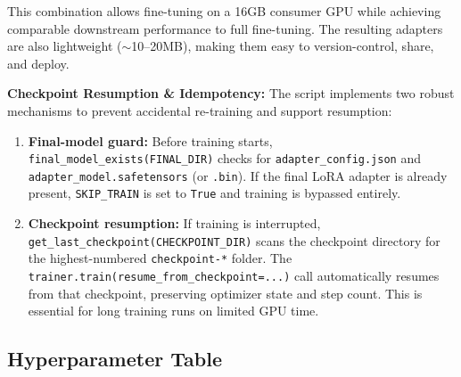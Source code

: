\documentclass[11pt,a4paper]{article}
\begin{document}
This combination allows fine-tuning on a 16GB consumer GPU while achieving comparable downstream performance to full fine-tuning. The resulting adapters are also lightweight ($\sim$10--20MB), making them easy to version-control, share, and deploy.

\textbf{Checkpoint Resumption \& Idempotency:} The script implements two robust mechanisms to prevent accidental re-training and support resumption:
\begin{enumerate}
    \item \textbf{Final-model guard:} Before training starts, \texttt{final\_model\_exists(FINAL\_DIR)} checks for \texttt{adapter\_config.json} and \texttt{adapter\_model.safetensors} (or \texttt{.bin}). If the final LoRA adapter is already present, \texttt{SKIP\_TRAIN} is set to \texttt{True} and training is bypassed entirely.
    \item \textbf{Checkpoint resumption:} If training is interrupted, \texttt{get\_last\_checkpoint(CHECKPOINT\_DIR)} scans the checkpoint directory for the highest-numbered \texttt{checkpoint-*} folder. The \texttt{trainer.train(resume\_from\_checkpoint=...)} call automatically resumes from that checkpoint, preserving optimizer state and step count. This is essential for long training runs on limited GPU time.
\end{enumerate}

\subsection{Hyperparameter Table}
\end{document}
